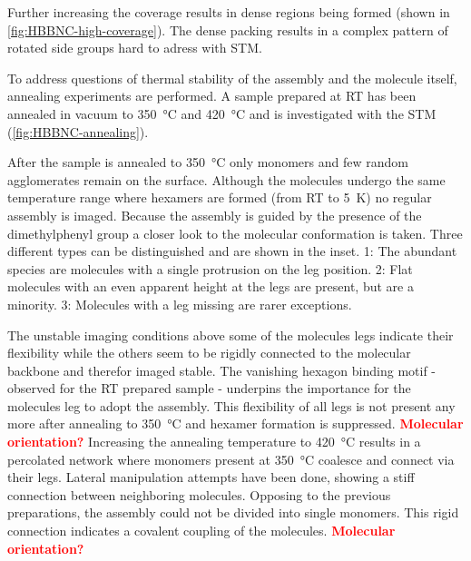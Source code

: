 Further increasing the coverage results in dense regions being formed (shown in \autoref{fig:HBBNC-high-coverage}). The dense packing results in a complex pattern of rotated side groups hard to adress with STM.

To address questions of thermal stability of the assembly and the molecule itself, annealing experiments are performed. A sample prepared at RT has been annealed in vacuum to \SI{350}{\celsius} and \SI{420}{\celsius} and is investigated with the STM (\autoref{fig:HBBNC-annealing}).

After the sample is annealed to \SI{350}{\celsius} only monomers and few random agglomerates remain on the surface. Although the molecules undergo the same temperature range where hexamers are formed (from RT to \SI{5}{\kelvin}) no regular assembly is imaged. Because the assembly is guided by the presence of the dimethylphenyl group a closer look to the molecular conformation is taken. Three different types can be distinguished and are shown in the inset. 
1: The abundant species are molecules with a single protrusion on the leg position.
2: Flat molecules with an even apparent height at the legs are present, but are a minority.
3: Molecules with a leg missing are rarer exceptions.

The unstable imaging conditions above some of the molecules legs indicate their flexibility while the others seem to be rigidly connected to the molecular backbone and therefor imaged stable. The vanishing hexagon binding motif - observed for the RT prepared sample - underpins the importance for the molecules leg to adopt the assembly. This flexibility of all legs is not present any more after annealing to \SI{350}{\celsius} and hexamer formation is suppressed.
\textcolor{red}{\textbf{Molecular orientation?}}
Increasing the annealing temperature to \SI{420}{\celsius} results in a percolated network where monomers present at \SI{350}{\celsius} coalesce and connect via their legs. Lateral manipulation attempts have been done, showing a stiff connection between neighboring molecules. Opposing to the previous preparations, the assembly could not be divided into single monomers. This rigid connection indicates a covalent coupling of the molecules. 
\textcolor{red}{\textbf{Molecular orientation?}}


